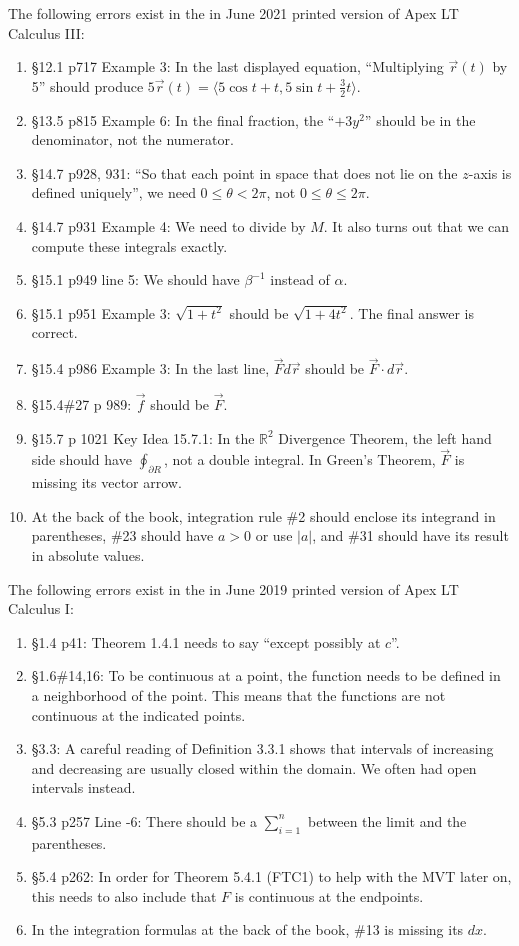 \documentclass{amsart}
\newcommand{\ds}{\displaystyle}
\begin{document}
The following errors exist in the in June 2021 printed version of Apex LT Calculus III:
\begin{enumerate}
\item \S12.1 p717 Example 3: In the last displayed equation, ``Multiplying $\vec r(t)$ by 5'' should produce $5\vec r(t)=\langle5\cos t+t,5\sin t+\frac32t\rangle$.
\item \S13.5 p815 Example 6: In the final fraction, the ``$+3y^2$'' should be in the denominator, not the numerator.
\item \S14.7 p928, 931: ``So that each point in space that does not lie on the $z$-axis is defined uniquely'', we need $0\le\theta<2\pi$, not $0\le\theta\le2\pi$.
\item \S14.7 p931 Example 4: We need to divide by $M$.  It also turns out that we can compute these integrals exactly.
\item \S15.1 p949 line 5: We should have $\beta^{-1}$ instead of $\alpha$.
\item \S15.1 p951 Example 3: $\sqrt{1+t^2}$ should be $\sqrt{1+4t^2}$.  The final answer is correct.
\item \S15.4 p986 Example 3: In the last line, $\vec Fd\vec r$ should be $\vec F\cdot d\vec r$.
\item \S15.4\#27 p 989: $\vec f$ should be $\vec F$.
\item \S15.7 p 1021 Key Idea 15.7.1: In the $\mathbb{R}^2$ Divergence Theorem, the left hand side should have $\oint_{\partial R}$, not a double integral.  In Green's Theorem, $\vec F$ is missing its vector arrow.
\item At the back of the book, integration rule \#2 should enclose its integrand in parentheses, \#23 should have $a>0$ or use $|a|$, and \#31 should have its result in absolute values.
\label{2021-06III}
\end{enumerate}

The following errors exist in the in June 2019 printed version of Apex LT Calculus I:
\begin{enumerate}
\item \S1.4 p41: Theorem 1.4.1 needs to say ``except possibly at $c$''.
\item \S1.6\#14,16: To be continuous at a point, the function needs to be defined in a neighborhood of the point.  This means that the functions are not continuous at the indicated points.
\item \S3.3: A careful reading of Definition 3.3.1 shows that intervals of increasing and decreasing are usually closed within the domain.  We often had open intervals instead.
\item \S5.3 p257 Line -6: There should be a $\ds\sum_{i=1}^n$ between the limit and the parentheses.
\item \S5.4 p262: In order for Theorem 5.4.1 (FTC1) to help with the MVT later on, this needs to also include that $F$ is continuous at the endpoints.
\item In the integration formulas at the back of the book, \#13 is missing its $dx$.
\label{2019-06Iplus}
\end{enumerate}
\end{document}
